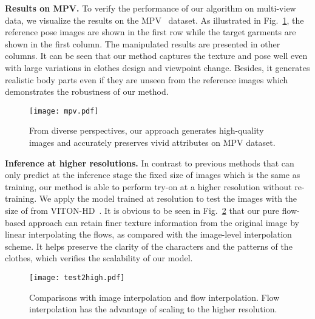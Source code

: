 \documentclass[runningheads]{llncs}
\begin{document}
\textbf{Results on MPV.}
To verify the performance of our algorithm on multi-view data, we visualize the results on the MPV~\cite{MPV} dataset. As illustrated in Fig.~\ref{mpvvis}, the reference pose images are shown in the first row while the target garments are shown in the first column. The manipulated results are presented in other columns. It can be seen that our method captures the texture and pose well even with large variations in clothes design and viewpoint change. Besides, it generates realistic body parts even if they are unseen from the reference images which demonstrates the robustness of our method.
\begin{figure}[t]
\centering
\texttt{[image: mpv.pdf]}
   \caption{From diverse perspectives, our approach generates high-quality images and accurately preserves vivid attributes on MPV dataset.}\label{mpvvis}
\end{figure}

\textbf{Inference at higher resolutions.}
In contrast to previous methods that can only predict at the inference stage the fixed size of images which is the same as training, our method is able to perform try-on at a higher resolution without re-training. We apply the model trained at  resolution to test the images with the size of  from VITON-HD~\cite{han2018viton}. It is obvious to be seen in Fig.~\ref{test_high} that our pure flow-based approach can retain finer texture information from the original image by linear interpolating the flows, as compared with the image-level interpolation scheme. It helps preserve the clarity of the characters and the patterns of the clothes, which verifies the scalability of our model.

\begin{figure}[t]
\centering
\texttt{[image: test2high.pdf]}

   \caption{Comparisons with image interpolation and flow interpolation. Flow interpolation has the advantage of scaling to the higher resolution. \label{test_high}}

\end{figure}
\begin{table}[t]
\caption{Comparisons with State-of-the-art methods on VITON under paired setting.}
\label{pair}
\end{table} 
\end{document}
